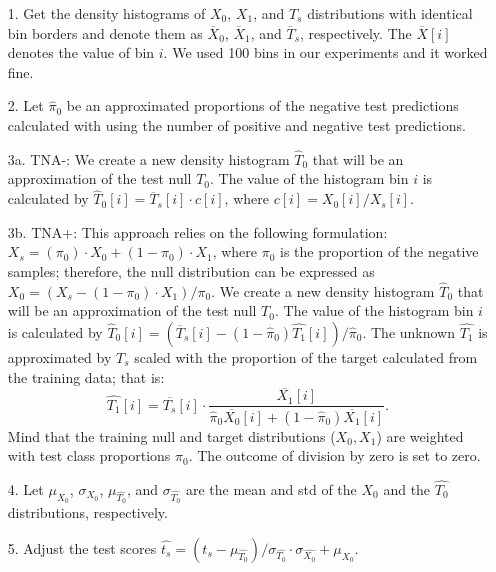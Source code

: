 \documentclass{article}
\begin{document}
\begin{enumerate}%
	\itemsep-3pt  		
	\item[1.] Get the density histograms of $X_0$, $X_1$, and $T_s$ distributions with identical bin borders and denote them as $\overline{X}_0$, $\overline{X}_1$, and $\overline{T}_s$, respectively. The $\overline{X}[i]$ denotes the value of bin $i$.  We used 100 bins in our experiments and it worked fine.
	
	\item[2.] Let $\hat{\pi}_0$ be an approximated proportions of the negative test predictions calculated with using the number of positive and negative test predictions. 

	\item [3a.] TNA-:  We create a new density histogram $\hat{T}_0$ that will be an approximation of the test null $T_0$. The value of the histogram bin $i$ is calculated  by $\hat{T}_0[i] = \overline{T}_s[i]\cdot c[i]$, where $c[i]=X_0[i]/X_s[i]$. 
	\item [3b.] TNA+: This approach relies on the following formulation: $X_s = (\pi_0) \cdot X_0 + (1-\pi_0) \cdot X_1$, where $\pi_0$ is the proportion of the negative samples; therefore, the null distribution can be expressed as $X_0 = (X_s - (1-\pi_0) \cdot X_1)/\pi_0$. We create a new density histogram $\hat{T}_0$ that will be an approximation of the test null $T_0$. The value of the histogram bin $i$ is calculated  by $\hat{T}_0[i] = (\overline{T}_s[i] -  (1-\hat{\pi}_0)\hat{T_1}[i])/\hat{\pi}_0$. The unknown $\hat{T_1}$ is approximated by $T_s$ scaled with the proportion of the target calculated from the training data; that is: 
$$\hat{T_1}[i] = \overline{T_s}[i]\cdot \frac {\overline{X_1}[i]}{\hat{\pi}_0 \overline{X_0}[i] + (1-\hat{\pi}_0) \overline{X_1}[i]}.$$ 
Mind that the training null and target distributions ($X_0,X_1$) are weighted with test class proportions  $\hat{\pi}_0$. The outcome of division by zero is set to zero.
	
		
	\item[4.] Let $\mu_{X_0}$, $\sigma_{X_0}$, $\mu_{\hat{T_0}}$, and $\sigma_{\hat{T_0}}$ are the mean and std of the $X_0$ and the $\hat{T_0}$ distributions, respectively. 
	
	\item[5.] Adjust the test scores $\hat{t_s} = (t_s-\mu_{\hat{T_0}})/\sigma_{\hat{T_0}} \cdot \sigma_{\hat{X_0}} + \mu_{X_0}$.
\end{enumerate}
	
\end{document}
